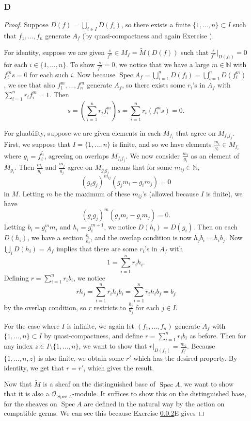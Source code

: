 \documentclass{article}
\newcommand{\N}{\mathbb{N}}
\newcommand{\fO}{\mathscr{O}}
\DeclareMathOperator{\Spec}{\mathrm{Spec}}
\begin{document}
\subsubsection{D}\label{4.1.D}
\begin{proof}
    Suppose $D(f)=\bigcup_{i\in I} D(f_i)$, so there exists a finite $\{1, \dots, n\}\subset I$ such that $f_1, \dots, f_n$ generate $A_f$ (by quasi-compactness and again Exercise  %
    ).

    For identity, suppose we are given $\frac{s}{f^n}\in M_f = \widetilde M(D(f))$ such that $\frac{s}{f^n}\vert_{D(f_i)}=0$ for each $i\in \{1, \dots, n\}$. To show $\frac{s}{f^n}=0$, we notice that we have a large $m\in \N$ with $f_i^m s =0$ for each such $i$. Now because $\Spec A_f = \bigcup_{i=1}^n D(f_i) = \bigcup_{i=1}^n D(f_i^m)$, we see that also $f_1^m, \dots, f_n^m$ generate $A_f$, so there exists some $r_i$'s in $A_f$ with $\sum_{i=1}^n r_i f_i^m =1$. Then
    \[
    s=(\sum_{i=1}^n r_i f_i^m)s = \sum_{i=1}^n r_i(f_i^m s) = 0.
    \]

    For gluability, suppose we are given elements in each $M_{f_i}$ that agree on $M_{f_i f_j}$. First, we suppose that $I=\{1, \dots, n\}$ is finite, and so we have elements $\frac{m_i}{g_i}\in M_{f_i}$ where $g_i=f_i^{l_i}$, agreeing on overlaps $M_{f_if_j}$. We now consider $\frac{m_i}{g_i}$ as an element of $M_{g_i}$. Then $\frac{m_i}{g_i}$ and $\frac{m_j}{g_j}$ agree on $M_{g_ig_j}$ means that for some $m_{ij}\in \N$,
    \[
    (g_ig_j)^{m_{ij}}(g_jm_i-g_im_j)=0
    \]
    in $M$. Letting $m$ be the maximum of these $m_{ij}$'s (allowed because $I$ is finite), we have
    \[
    (g_i g_j)^m (g_j m_i-g_i m_j)=0.
    \]
    Letting $b_i=g_i^m m_i$ and $h_i=g_i^{m+1}$, we notice $D(h_i)=D(g_i)$. Then on each $D(h_i)$, we have a section $\frac{b_i}{h_i}$, and the overlap condition is now $h_j b_i = h_i b_j$. Now $\bigcup_i D(h_i) = A_f$ implies that there are some $r_i$'s in $A_f$ with
    \[
    1=\sum_{i=1}^n r_i h_i.
    \]
    Defining $r=\sum_{i=1}^n r_i b_i$, we notice
    \[
    rh_j=\sum_{i=1}^n r_i h_j b_i = \sum_{i=1}^n r_i h_i b_j= b_j
    \]
    by the overlap condition, so $r$ restricts to $\frac{b_j}{h_j}$ for each $j\in I$.

    For the case where $I$ is infinite, we again let $(f_1, \dots, f_n)$ generate $A_f$ with $\{1, \dots, n\} \subset I$ by quasi-compactness, and define $r=\sum_{i=1}^n r_i b_i$ as before. Then for any index $z\in I\setminus \{1, \dots, n\}$, we want to show that $r\vert_{D(f_z)}=\frac{m_z}{f_z^{l_z}}$. Because $\{1, \dots, n, z\}$ is also finite, we obtain some $r'$ which has the desired property. By identity, we get that $r=r'$, which gives the result.

    Now that $\widetilde M$ is a sheaf on the distinguished base of $\Spec A$, we want to show that it is also a $\fO_{\Spec A}$-module. It suffices to show this on the distinguished base, for the sheaves on $\Spec A$ are defined in the natural way by the action on compatible germs. We can see this because Exercise \ref{4.1.E}E gives 
    
\end{proof}

\subsubsection{}\label{4.1.E}
\printbibliography
\end{document}
